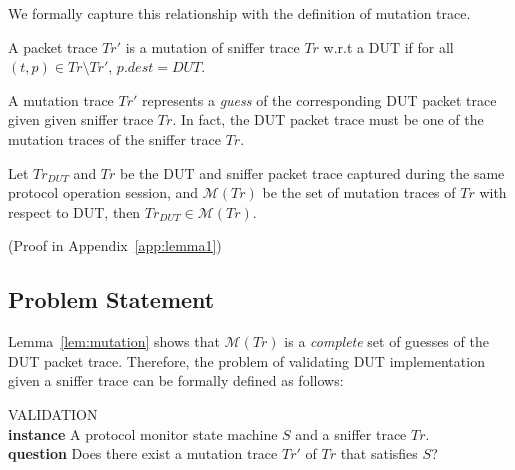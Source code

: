 We formally capture this relationship with the definition of mutation trace.

\begin{definition}
  \label{def:mutation}
  A packet trace $Tr'$ is a mutation of sniffer trace $Tr$ w.r.t a DUT if for
  all $(t, p) \in Tr\setminus Tr'$, $p.dest = DUT$.
\end{definition}

A mutation trace $Tr'$ represents a \textit{guess} of the corresponding DUT
packet trace given given sniffer trace $Tr$.  In fact, the DUT packet trace must
be one of the mutation traces of the sniffer trace $Tr$.

\begin{lemma}
  Let $Tr_{DUT}$ and $Tr$ be the DUT and sniffer packet trace captured during
  the same protocol operation session, and $\mathcal{M}(Tr)$ be the set of
  mutation traces of $Tr$ with respect to DUT, then $Tr_{DUT} \in \mathcal{M}(Tr)$.
  \label{lem:mutation}
\end{lemma}%
(Proof in Appendix~\ref{app:lemma1})


\subsection{Problem Statement}
\label{subsec:problem}

Lemma~\ref{lem:mutation} shows that $\mathcal{M}(Tr)$ is a \textit{complete} set
of guesses of the DUT packet trace. Therefore, the problem of validating DUT
implementation given a sniffer trace can be formally defined as follows:

\begin{problem}
  \label{prob:validation}
  VALIDATION\\
  \textbf{instance} A protocol monitor state machine $S$ and a sniffer trace $Tr$.\\
  \textbf{question} Does there exist a mutation trace $Tr'$ of $Tr$ that satisfies $S$?
\end{problem}
